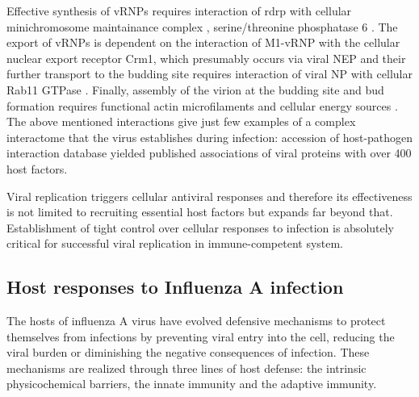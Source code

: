 	Effective synthesis of \glspl{vRNP} requires interaction of \gls{rdrp} with cellular minichromosome maintainance complex \parencite{Kawaguchi2007}, serine/threonine phosphatase 6 \parencite{York2014}. The export of \glspl{vRNP} is dependent on the interaction of \gls{M1}-\gls{vRNP} with the cellular nuclear export receptor Crm1, which presumably occurs via viral \gls{NEP} \parencite{Brunotte2014} and their further transport to the budding site requires interaction of viral \gls{NP} with cellular Rab11 GTPase \parencite{Eisfeld2011}. Finally, assembly of the virion at the budding site and bud formation requires functional actin microfilaments and cellular energy sources \parencite{Nayak2004}. 	The above mentioned interactions give just few examples of a complex interactome that the virus establishes during infection: accession of host-pathogen interaction database  \parencite{Kumar2010} yielded published associations of viral proteins with over 400 host factors. 
	
	Viral replication triggers cellular antiviral responses and therefore its effectiveness is not limited to recruiting essential host factors but expands far beyond that. Establishment of tight control over cellular responses to infection is absolutely critical for successful viral replication in immune-competent system. 
	
			
	
	\subsection{Host responses to Influenza A infection}
	
	The hosts of influenza A virus have evolved defensive mechanisms to protect themselves from infections by preventing viral entry into the cell, reducing the viral burden or diminishing the negative consequences of infection. These mechanisms are realized through three lines of host defense: the intrinsic physicochemical barriers, the innate immunity and the adaptive immunity.
	
